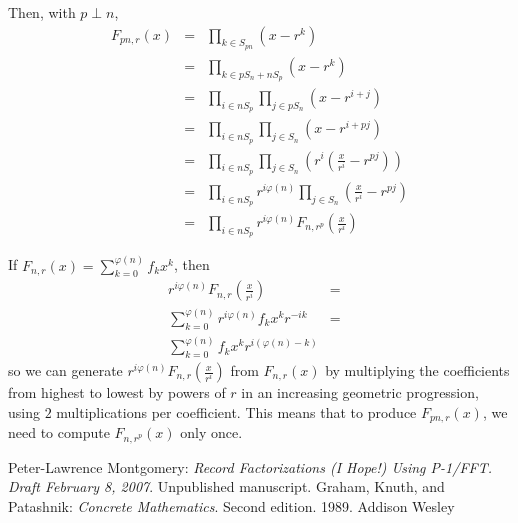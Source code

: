 \documentclass{article}
\begin{document}
Then, with $p \perp n$,
\begin{eqnarray*}
F_{pn,r}(x) & = & \prod_{k \in S_{pn}} \left(x-r^k\right) \\
            & = & \prod_{k \in pS_n + nS_p} \left(x-r^k\right) \\
            & = & \prod_{i \in nS_p} \prod_{j \in pS_n} \left(x-r^{i+j}\right) \\
            & = & \prod_{i \in nS_p} \prod_{j \in S_n} \left(x-r^{i+pj}\right) \\
            & = & \prod_{i \in nS_p} \prod_{j \in S_n} \left(r^i \left(\frac{x}{r^i}-r^{pj}\right)\right) \\
            & = & \prod_{i \in nS_p} r^{i\varphi(n)} \prod_{j \in S_n} \left(\frac{x}{r^i}-r^{pj}\right) \\
            & = & \prod_{i \in nS_p} r^{i\varphi(n)} F_{n,r^p}\left(\frac{x}{r^i}\right)
\end{eqnarray*}

If $F_{n,r}(x) = \sum_{k=0}^{\varphi(n)} f_k x^k$, then 
\begin{eqnarray*}
r^{i\varphi(n)} F_{n,r}\left(\frac{x}{r^i}\right) & = &\\
\sum_{k=0}^{\varphi(n)} r^{i\varphi(n)} f_k x^k r^{-ik} & = & \\
\sum_{k=0}^{\varphi(n)} f_k x^k r^{i(\varphi(n)-k)} &&
\end{eqnarray*}
so we can generate $r^{i\varphi(n)} F_{n,r}\left(\frac{x}{r^i}\right)$ from 
$F_{n,r}(x)$ by multiplying the coefficients from highest to lowest by powers 
of $r$ in an increasing geometric progression, using $2$ multiplications 
per coefficient. This means that to produce $F_{pn,r}(x)$, we need to compute 
$F_{n,r^p}(x)$ only once.

\begin{thebibliography}{}
 Peter-Lawrence Montgomery: 
{\it Record Factorizations (I Hope!) Using P-1/FFT. Draft February 8, 2007}. 
Unpublished manuscript.
Graham, Knuth, and Patashnik: 
{\it Concrete Mathematics}. Second edition. 1989. Addison Wesley
\end{thebibliography}
\end{document}
